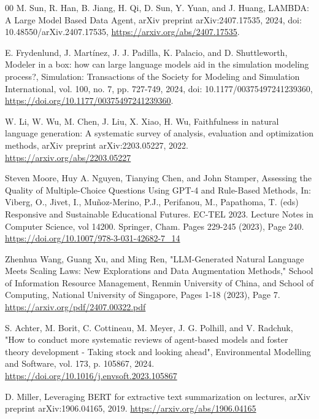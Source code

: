 \documentclass[preprint,12pt]{elsarticle}
\begin{document}
\begin{thebibliography}{00}
M. Sun, R. Han, B. Jiang, H. Qi, D. Sun, Y. Yuan, and J. Huang,
LAMBDA: A Large Model Based Data Agent,
arXiv preprint arXiv:2407.17535, 2024,
doi: 10.48550/arXiv.2407.17535,
\href{https://arxiv.org/abs/2407.17535}{https://arxiv.org/abs/2407.17535}.

E. Frydenlund, J. Martínez, J. J. Padilla, K. Palacio, and D. Shuttleworth,
Modeler in a box: how can large language models aid in the simulation modeling process?,
Simulation: Transactions of the Society for Modeling and Simulation International, vol. 100, no. 7, pp. 727-749, 2024,
doi: 10.1177/00375497241239360,
\href{https://doi.org/10.1177/00375497241239360}{https://doi.org/10.1177/00375497241239360}.


W. Li, W. Wu, M. Chen, J. Liu, X. Xiao, H. Wu,
Faithfulness in natural language generation: A systematic survey of analysis, evaluation and optimization methods,
arXiv preprint arXiv:2203.05227, 2022.
\href{https://arxiv.org/abs/2203.05227}{https://arxiv.org/abs/2203.05227}

Steven Moore, Huy A. Nguyen, Tianying Chen, and John Stamper,
Assessing the Quality of Multiple-Choice Questions Using GPT-4 and Rule-Based Methods,
In: Viberg, O., Jivet, I., Muñoz-Merino, P.J., Perifanou, M., Papathoma, T. (eds) Responsive and Sustainable Educational Futures. EC-TEL 2023. Lecture Notes in Computer Science, vol 14200. Springer, Cham.
Pages 229-245 (2023), Page 240.
\href{https://doi.org/10.1007/978-3-031-42682-7_14}{https://doi.org/10.1007/978-3-031-42682-7_14}

Zhenhua Wang, Guang Xu, and Ming Ren,
"LLM-Generated Natural Language Meets Scaling Laws: New Explorations and Data Augmentation Methods,"
School of Information Resource Management, Renmin University of China, and School of Computing, National University of Singapore,
Pages 1-18 (2023), Page 7.
\href{https://arxiv.org/pdf/2407.00322.pdf}{https://arxiv.org/pdf/2407.00322.pdf}


S. Achter, M. Borit, C. Cottineau, M. Meyer, J. G. Polhill, and V. Radchuk,
"How to conduct more systematic reviews of agent-based models and foster theory development - Taking stock and looking ahead",
Environmental Modelling and Software, vol. 173, p. 105867, 2024.
\href{https://doi.org/10.1016/j.envsoft.2023.105867}{https://doi.org/10.1016/j.envsoft.2023.105867}


D. Miller,
Leveraging BERT for extractive text summarization on lectures,
arXiv preprint arXiv:1906.04165, 2019.
\href{https://arxiv.org/abs/1906.04165}{https://arxiv.org/abs/1906.04165}


\end{thebibliography}
\end{document}
